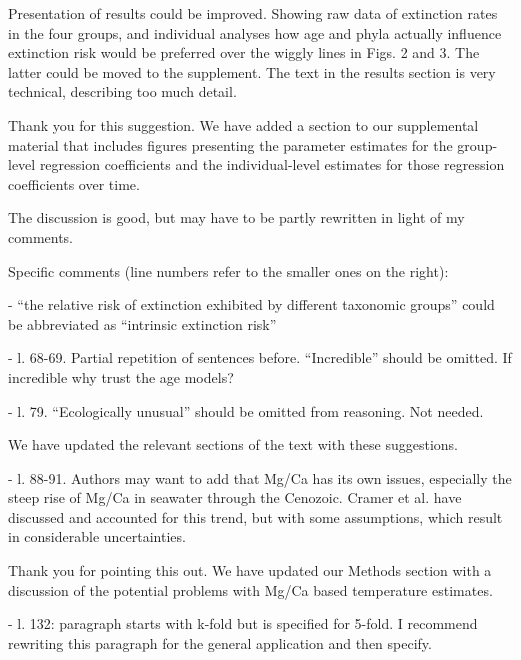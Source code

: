 \documentclass[12pt,letterpaper]{article}
\begin{document}
\begin{refsection}
\begin{bfseries}
  Presentation of results could be improved. Showing raw data of extinction rates in the four groups, and individual analyses how age and phyla actually influence extinction risk would be preferred over the wiggly lines in Figs. 2 and 3. The latter could be moved to the supplement. The text in the results section is very technical, describing too much detail. 
\end{bfseries}

Thank you for this suggestion. We have added a section to our supplemental material that includes figures presenting the parameter estimates for the group-level regression coefficients and the individual-level estimates for those regression coefficients over time. 

\begin{bfseries}
  The discussion is good, but may have to be partly rewritten in light of my comments. 

  Specific comments (line numbers refer to the smaller ones on the right):

  - “the relative risk of extinction exhibited by different taxonomic groups” could be abbreviated as “intrinsic extinction risk”

  - l. 68-69. Partial repetition of sentences before. “Incredible” should be omitted. If incredible why trust the age models?

  - l. 79. “Ecologically unusual” should be omitted from reasoning. Not needed. 
\end{bfseries}

We have updated the relevant sections of the text with these suggestions.

\begin{bfseries}
  - l. 88-91. Authors may want to add that Mg/Ca has its own issues, especially the steep rise of Mg/Ca in seawater through the Cenozoic. Cramer et al. have discussed and accounted for this trend, but with some assumptions, which result in considerable uncertainties.
\end{bfseries}

Thank you for pointing this out. We have updated our Methods section with a discussion of the potential problems with Mg/Ca based temperature estimates. 

\begin{bfseries}
  - l. 132: paragraph starts with k-fold but is specified for 5-fold. I recommend rewriting this paragraph for the general application and then specify.


\end{bfseries}
\end{refsection}
\end{document}
